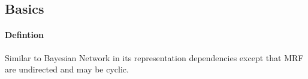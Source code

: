 \subsection{Basics}
\paragraph{Defintion}
Similar to Bayesian Network in its representation dependencies except that
MRF are undirected and may be cyclic. 